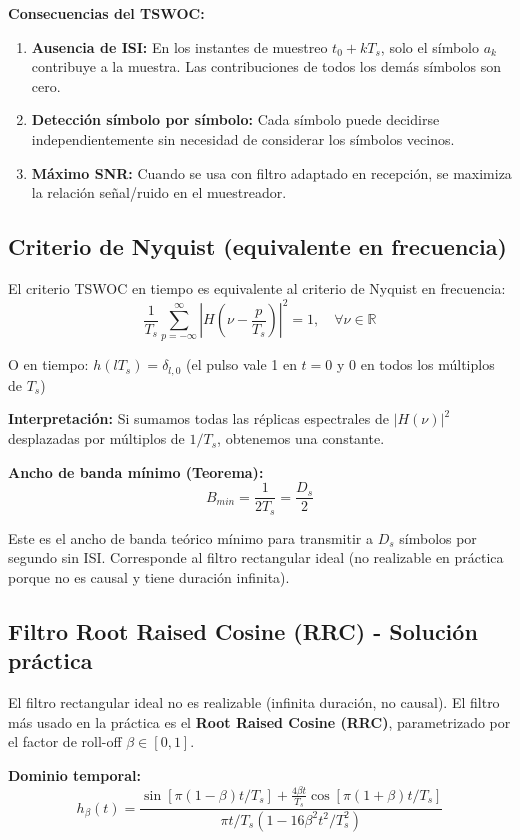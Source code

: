 \documentclass[10pt,a4paper]{article}
\begin{document}
\textbf{Consecuencias del TSWOC:}
\begin{enumerate}
\item \textbf{Ausencia de ISI:} En los instantes de muestreo $t_0 + kT_s$, solo el símbolo $a_k$ contribuye a la muestra. Las contribuciones de todos los demás símbolos son cero.

\item \textbf{Detección símbolo por símbolo:} Cada símbolo puede decidirse independientemente sin necesidad de considerar los símbolos vecinos.

\item \textbf{Máximo SNR:} Cuando se usa con filtro adaptado en recepción, se maximiza la relación señal/ruido en el muestreador.
\end{enumerate}

\subsection{Criterio de Nyquist (equivalente en frecuencia)}

El criterio TSWOC en tiempo es equivalente al criterio de Nyquist en frecuencia:
$$\frac{1}{T_s}\sum_{p=-\infty}^{\infty} |H(\nu - \frac{p}{T_s})|^2 = 1, \quad \forall \nu \in \mathbb{R}$$

O en tiempo: $h(lT_s) = \delta_{l,0}$ (el pulso vale 1 en $t=0$ y 0 en todos los múltiplos de $T_s$)

\textbf{Interpretación:} Si sumamos todas las réplicas espectrales de $|H(\nu)|^2$ desplazadas por múltiplos de $1/T_s$, obtenemos una constante.

\textbf{Ancho de banda mínimo (Teorema):}
$$B_{min} = \frac{1}{2T_s} = \frac{D_s}{2}$$

Este es el ancho de banda teórico mínimo para transmitir a $D_s$ símbolos por segundo sin ISI. Corresponde al filtro rectangular ideal (no realizable en práctica porque no es causal y tiene duración infinita).

\subsection{Filtro Root Raised Cosine (RRC) - Solución práctica}

El filtro rectangular ideal no es realizable (infinita duración, no causal). El filtro más usado en la práctica es el \textbf{Root Raised Cosine (RRC)}, parametrizado por el factor de roll-off $\beta \in [0,1]$.

\textbf{Dominio temporal:}
$$h_{\beta}(t) = \frac{\sin[\pi(1-\beta)t/T_s] + \frac{4\beta t}{T_s}\cos[\pi(1+\beta)t/T_s]}{\pi t/T_s (1-16\beta^2t^2/T_s^2)}$$
\end{document}
